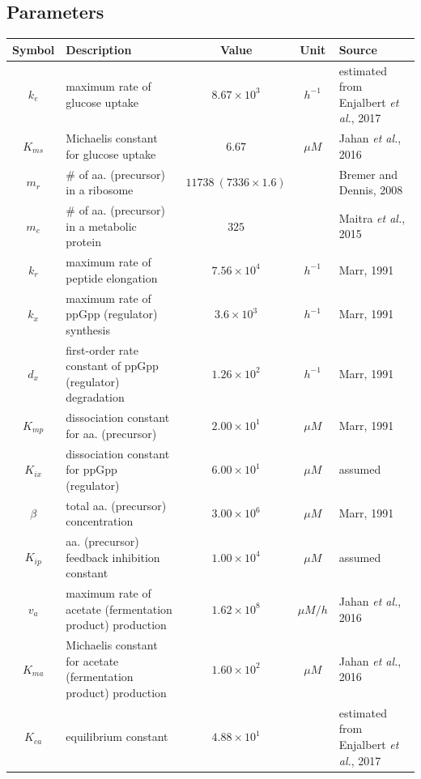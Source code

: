\documentclass[11pt]{article}
\begin{document}
{  \subsection{Parameters}
  \begin{table}[!htbp]
\centering
\tiny
\setlength\extrarowheight{5pt}
\begin{tabular}{|c|l|c|c|l|}
\hline
 \textbf{Symbol} & \textbf{Description} & \textbf{Value}  & \textbf{Unit}  & \textbf{Source}  \\ \hline
 $k_e$ & maximum rate of glucose uptake      & $8.67\times 10^3$   &  $h^{-1}$  & estimated from Enjalbert \textit{et al.}, 2017\\ \hline
 $K_{ms}$ & Michaelis constant for glucose uptake & $6.67$ & $\mu M$ & Jahan \textit{et al.}, 2016\\ \hline
 $m_r$ & \# of aa. (precursor) in a ribosome   & $11738~(7336\times1.6)$ & & Bremer and Dennis, 2008  \\ \hline
 $m_e$ & \# of aa. (precursor) in a metabolic protein & $325$           & & Maitra \textit{et al.}, 2015 \\ \hline
 $k_r$ & maximum rate of peptide elongation & $7.56\times 10^4$   & $h^{-1}$ & Marr, 1991 \\ \hline
 $k_x$ & maximum rate of ppGpp (regulator) synthesis   &  $3.6\times 10^{3}$  & $h^{-1}$  & Marr, 1991 \\ \hline
 $d_x$ &  first-order rate constant of ppGpp (regulator) degradation & $1.26\times 10^{2}$ & $h^{-1}$ & Marr, 1991 \\ \hline
 $K_{mp}$ & dissociation constant for aa. (precursor) & $2.00\times 10^{1}$ & $\mu M$ & Marr, 1991 \\ \hline
 $K_{ix}$ & dissociation constant for ppGpp (regulator) & $6.00\times10^{1}$ & $\mu M$ & assumed \\ \hline
 $\beta$ & total aa. (precursor) concentration & $3.00\times 10^6$ & $\mu M$ & Marr, 1991 \\ \hline
 $K_{ip}$ & aa. (precursor) feedback inhibition constant & $1.00\times 10^{4}$ & $\mu M$ & assumed\\ \hline
 $v_a$ & maximum rate of acetate (fermentation product) production & $1.62\times 10^{8}$ & $\mu M/h$&  Jahan \textit{et al.}, 2016\\ \hline
 $K_{ma}$ & Michaelis constant for acetate (fermentation product) production& $1.60\times 10^{2}$ & $\mu M$ & Jahan \textit{et al.}, 2016\\ \hline
  $K_{ca}$ & equilibrium constant & $4.88\times 10^1$ &  & estimated from Enjalbert \textit{et al.}, 2017 \\ \hline

\end{tabular}
\end{table}}
\end{document}

